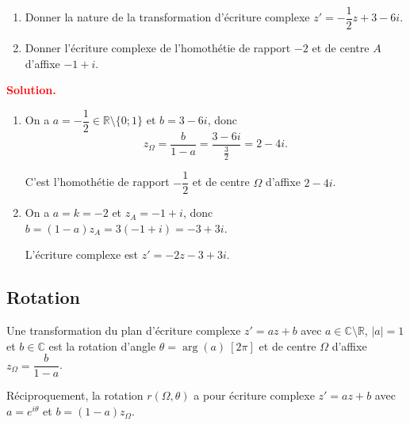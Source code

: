 \documentclass[12pt,a4paper]{article}
\newcommand{\C}{\mathbb{C}}
\newcommand{\R}{\mathbb{R}}
\newcommand{\zO}{z_{\Omega}}
\newcommand{\arge}{\operatorname{arg}}
\newcommand{\solution}{\par\smallskip\noindent\textbf{\textcolor{red}{Solution.}}\par}
\begin{document}
\begin{exo}
\begin{enumerate}
  \item Donner la nature de la transformation d'écriture complexe $z'=-\dfrac12 z+3-6i$.
  \item Donner l'écriture complexe de l'homothétie de rapport $-2$ et de centre $A$ d'affixe $-1+i$.
\end{enumerate}
\end{exo}

\solution
\begin{enumerate}
  \item On a $a=-\dfrac12\in\R\setminus\{0;1\}$ et $b=3-6i$, donc
  \[
  \zO=\frac{b}{1-a}=\frac{3-6i}{\frac32}=2-4i .
  \]
  \begin{resultat}
  C'est l'homothétie de rapport $-\dfrac12$ et de centre $\Omega$ d'affixe $2-4i$.
  \end{resultat}
  \item On a $a=k=-2$ et $z_A=-1+i$, donc
  $b=(1-a)z_A=3(-1+i)=-3+3i$.
  \begin{resultat}
  L'écriture complexe est $z'=-2z-3+3i$.
  \end{resultat}
\end{enumerate}

\subsection{Rotation}

\begin{prop}
Une transformation du plan d'écriture complexe $z'=az+b$ avec $a\in\C\setminus\R$, $|a|=1$ et $b\in\C$
est la rotation d'angle $\theta=\arge(a)\ [2\pi]$ et de centre $\Omega$ d'affixe $\zO=\dfrac{b}{1-a}$.

Réciproquement, la rotation $r(\Omega,\theta)$ a pour écriture complexe $z'=az+b$ avec
$a=e^{i\theta}$ et $b=(1-a)\zO$.
\end{prop}
\end{document}
